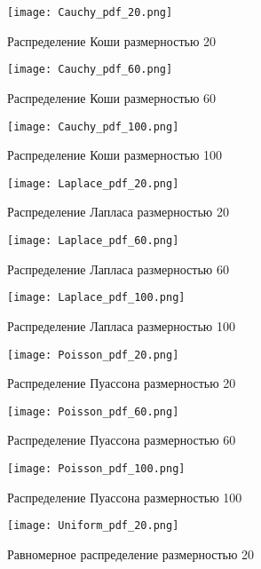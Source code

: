 \documentclass[12pt,a4paper]{article}
\begin{document}
\begin{figure}[H]
    \centering
    \texttt{[image: Cauchy\_pdf\_20.png]}
    \caption{Распределение Коши размерностью 20}
\end{figure}

\begin{figure}[H]
    \centering
    \texttt{[image: Cauchy\_pdf\_60.png]}
    \caption{Распределение Коши размерностью 60}
\end{figure}

\begin{figure}[H]
    \centering
    \texttt{[image: Cauchy\_pdf\_100.png]}
    \caption{Распределение Коши размерностью 100}
\end{figure}

\begin{figure}[H]
    \centering
    \texttt{[image: Laplace\_pdf\_20.png]}
    \caption{Распределение Лапласа размерностью 20}
\end{figure}

\begin{figure}[H]
    \centering
    \texttt{[image: Laplace\_pdf\_60.png]}
    \caption{Распределение Лапласа размерностью 60}
\end{figure}

\begin{figure}[H]
    \centering
    \texttt{[image: Laplace\_pdf\_100.png]}
    \caption{Распределение Лапласа размерностью 100}
\end{figure}

\begin{figure}[H]
    \centering
    \texttt{[image: Poisson\_pdf\_20.png]}
    \caption{Распределение Пуассона размерностью 20}
\end{figure}

\begin{figure}[H]
    \centering
    \texttt{[image: Poisson\_pdf\_60.png]}
    \caption{Распределение Пуассона размерностью 60}
\end{figure}

\begin{figure}[H]
    \centering
    \texttt{[image: Poisson\_pdf\_100.png]}
    \caption{Распределение Пуассона размерностью 100}
\end{figure}

\begin{figure}[H]
    \centering
    \texttt{[image: Uniform\_pdf\_20.png]}
    \caption{Равномерное распределение размерностью 20}
\end{figure}
\end{document}
